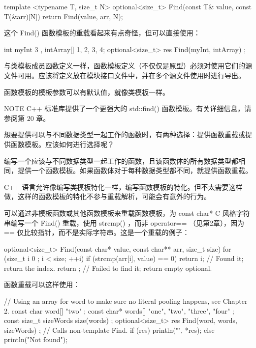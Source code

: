 \begin{cpp}
template <typename T, size_t N>
optional<size_t> Find(const T& value, const T(&arr)[N])
{
    return Find(value, arr, N);
}
\end{cpp}

这个 Find() 函数模板的重载看起来有点奇怪，但可以直接使用：

\begin{cpp}
int myInt { 3 }, intArray[] {1, 2, 3, 4};
optional<size_t> res { Find(myInt, intArray) };
\end{cpp}

与类模板成员函数定义一样，函数模板定义（不仅仅是原型）必须对使用它们的源文件可用。应该将定义放在模块接口文件中，并在多个源文件使用时进行导出。

函数模板的模板参数可以有默认值，就像类模板一样。

\begin{myNotic}{NOTE}
C++ 标准库提供了一个更强大的 std::find() 函数模板。有关详细信息，请参阅第 20 章。
\end{myNotic}


想要提供可以与不同数据类型一起工作的函数时，有两种选择：提供函数重载或提供函数模板。应该如何进行选择呢？

编写一个应该与不同数据类型一起工作的函数，且该函数体的所有数据类型都相同，提供一个函数模板。如果函数体对于每种数据类型都不同，就提供函数重载。


C++ 语言允许像编写类模板特化一样，编写函数模板的特化。但不太需要这样做，这样的函数模板的特化不参与重载解析，可能会有意外的行为。

可以通过非模板函数或其他函数模板来重载函数模板，为 const char* C 风格字符串编写一个 Find() 重载，使用 strcmp() ，而非 operator== （见第2章），因为 == 仅比较指针，而不是实际字符串。这是一个重载的例子：

\begin{cpp}
optional<size_t> Find(const char* value, const char** arr, size_t size)
{
    for (size_t i { 0 }; i < size; ++i) {
        if (strcmp(arr[i], value) == 0) {
            return i; // Found it; return the index.
        }
    }
    return {}; // Failed to find it; return empty optional.
}
\end{cpp}

函数重载可以这样使用：

\begin{cpp}
// Using an array for word to make sure no literal pooling happens, see Chapter 2.
const char word[] { "two" };
const char* words[] { "one", "two", "three", "four" };
const size_t sizeWords { size(words) };
optional<size_t> res { Find(word, words, sizeWords) }; // Calls non-template Find.
if (res) { println("{}", *res); }
else { println("Not found"); }
\end{cpp}

